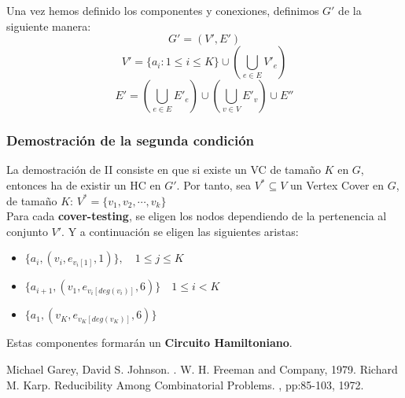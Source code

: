 \documentclass[a4paper]{article}
\begin{document}
Una vez hemos definido los componentes y conexiones, definimos $G'$ de la siguiente manera:
 \[G' = (V', E')\]
        \[V' = \{a_i : 1 \le i \le K\} \cup (\bigcup_{e \in E} V'_e)\]
        \[E' = (\bigcup_{e \in E} E'_e) \cup (\bigcup_{v \in V} E'_v) \cup E''\]

\subsubsection{Demostración de la segunda condición}
La demostración de II consiste en que si existe un VC de tamaño $K$ en $G$, entonces ha de existir un HC en $G'$. Por tanto, sea $V^* \subseteq V$ un Vertex Cover en $G$, de tamaño $K$: $V^* = \{v_1,v_2, \cdots, v_k \}$\\

Para cada \textbf{cover-testing}, se eligen los nodos dependiendo de la pertenencia al conjunto $V'$. Y a continuación se eligen las siguientes aristas:
\begin{itemize}
            \item $\{a_i, (v_i, e_{v_i[1]}, 1)\}, \quad 1 \le j \le K$
            \item $\{a_{i+1}, (v_1, e_{v_i[deg(v_i)]}, 6)\} \quad 1 \le i < K$
            \item $\{a_1, (v_K, e_{v_K[deg(v_K)]}, 6)\}$
\end{itemize}

Estas componentes formarán un \textbf{Circuito Hamiltoniano}.

\begin{thebibliography}{9}
             Michael Garey, David S. Johnson.
            .
            \newblock W. H. Freeman and Company, 1979.
            Richard M. Karp.
            \newblock Reducibility Among Combinatorial Problems.
            , pp:85-103, 1972.
\end{thebibliography}
\end{document}
